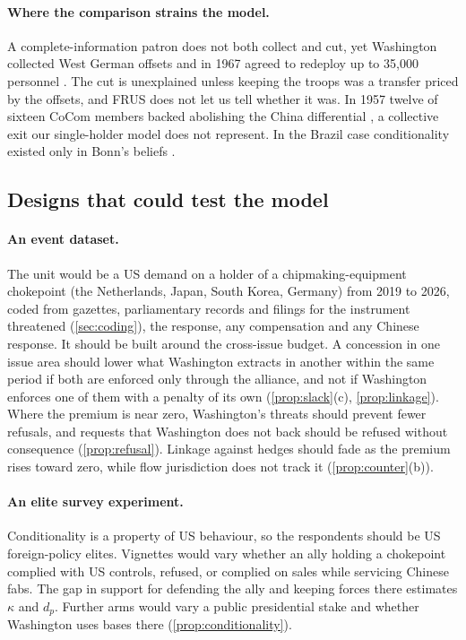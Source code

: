 \paragraph{Where the comparison strains the model.} A complete-information patron does not both collect and cut, yet Washington collected West German offsets and in 1967 agreed to redeploy up to 35,000 personnel \citep{frus1995foreignecon, frus1999germany, frus1995westerneurope}. The cut is unexplained unless keeping the troops was a transfer priced by the offsets, and FRUS does not let us tell whether it was. In 1957 twelve of sixteen CoCom members backed abolishing the China differential \citep{frus1989economicdefense, mastanduno1992economic}, a collective exit our single-holder model does not represent. In the Brazil case conditionality existed only in Bonn's beliefs \citep{frus2014westerneurope}.

\subsection{Designs that could test the model}\label{sec:tests}

\paragraph{An event dataset.} The unit would be a US demand on a holder of a chipmaking-equipment chokepoint (the Netherlands, Japan, South Korea, Germany) from 2019 to 2026, coded from gazettes, parliamentary records and filings for the instrument threatened (\cref{sec:coding}), the response, any compensation and any Chinese response. It should be built around the cross-issue budget. A concession in one issue area should lower what Washington extracts in another within the same period if both are enforced only through the alliance, and not if Washington enforces one of them with a penalty of its own (\cref{prop:slack}(c), \cref{prop:linkage}). Where the premium is near zero, Washington's threats should prevent fewer refusals, and requests that Washington does not back should be refused without consequence (\cref{prop:refusal}). Linkage against hedges should fade as the premium rises toward zero, while flow jurisdiction does not track it (\cref{prop:counter}(b)).

\paragraph{An elite survey experiment.} Conditionality is a property of US behaviour, so the respondents should be US foreign-policy elites. Vignettes would vary whether an ally holding a chokepoint complied with US controls, refused, or complied on sales while servicing Chinese fabs. The gap in support for defending the ally and keeping forces there estimates $\kappa$ and $d_p$. Further arms would vary a public presidential stake and whether Washington uses bases there (\cref{prop:conditionality}).


